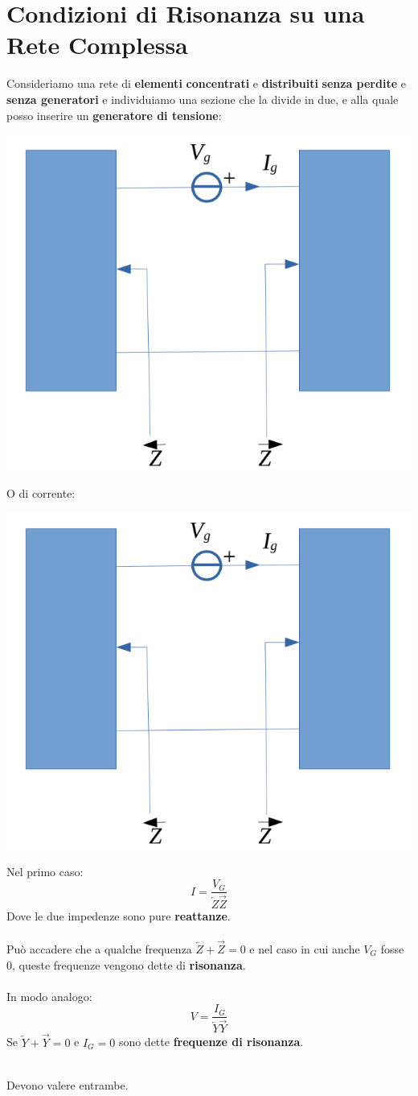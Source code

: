 \section{Condizioni di Risonanza su una Rete Complessa}
Consideriamo una rete di \textbf{elementi} \textbf{concentrati} e \textbf{distribuiti} \textbf{senza perdite} e \textbf{senza generatori} e individuiamo una sezione che la divide in due, e alla quale posso inserire un \textbf{generatore di tensione}:
\begin{center}
    \includegraphics[width=.5\textwidth]{Images/figure31.png}
\end{center}
O di corrente:
\begin{center}
    \includegraphics[width=.5\textwidth]{Images/figure31.png}
\end{center}
Nel primo caso:
\begin{equation*}
    I = \frac{V_G}{\overleftarrow{Z}\overrightarrow{Z}}
\end{equation*}
Dove le due impedenze sono pure \textbf{reattanze}.\\ \\
Può accadere che a qualche frequenza $\overleftarrow{Z} + \overrightarrow{Z} = 0$ e nel caso in cui anche $V_G$ fosse 0, queste frequenze vengono dette di \textbf{risonanza}. \\ \\
In modo analogo:
\begin{equation*}
    V = \frac{I_G}{\overleftarrow{Y}\overrightarrow{Y}}
\end{equation*}
Se $\overleftarrow{Y} + \overrightarrow{Y} = 0$ e  $I_G = 0$ sono dette \textbf{frequenze di risonanza}.\\ \\
\begin{center}
    Devono valere entrambe.
\end{center}

